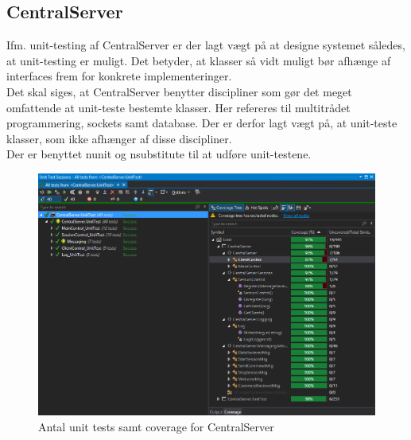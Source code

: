 \subsection{CentralServer}
Ifm. unit-testing af CentralServer er der lagt vægt på at designe systemet således, at unit-testing er muligt. Det betyder, at klasser så vidt muligt bør afhænge af interfaces frem for konkrete implementeringer.\\

Det skal siges, at CentralServer benytter discipliner som gør det meget omfattende at unit-teste bestemte klasser. Her refereres til multitrådet programmering, sockets samt database. Der er derfor lagt vægt på, at unit-teste klasser, som ikke afhænger af disse discipliner.\\

Der er benyttet nunit og nsubstitute til at udføre unit-testene.


	\begin{figure}[H]
		\centering
		\includegraphics[width=1\textwidth]{Test/Images/CentralServer_unittest.png}
		\caption{Antal unit tests samt coverage for CentralServer}
		\label{fig:antalunit}
	\end{figure}
